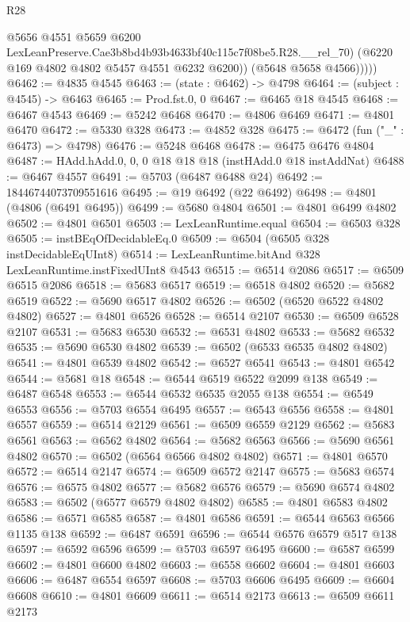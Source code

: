 \begin{lexlean}{R28}
\begin{coremodule}
                @5656
                @4551
                @5659
                @6200
                LexLeanPreserve.Cae3b8bd4b93b4633bf40c115c7f08be5.R28.__rel_70)
              (@6220 @169 @4802 @4802 @5457 @4551 @6232 @6200))
            (@5648 @5658 @4566)))))
@6462 := @4835 @4545
@6463 := (state : @6462) -> @4798
@6464 := (subject : @4545) -> @6463
@6465 := Prod.fst.{0, 0}
@6467 := @6465 @18 @4545
@6468 := @6467 @4543
@6469 := @5242 @6468
@6470 := @4806 @6469
@6471 := @4801 @6470
@6472 := @5330 @328
@6473 := @4852 @328
@6475 := @6472 (fun ("_" : @6473) => @4798)
@6476 := @5248 @6468
@6478 := @6475 @6476 @4804
@6487 := HAdd.hAdd.{0, 0, 0} @18 @18 @18 (instHAdd.{0} @18 instAddNat)
@6488 := @6467 @4557
@6491 := @5703 (@6487 @6488 @24)
@6492 := 18446744073709551616
@6495 := @19 @6492 (@22 @6492)
@6498 := @4801 (@4806 (@6491 @6495))
@6499 := @5680 @4804
@6501 := @4801 @6499 @4802
@6502 := @4801 @6501
@6503 := LexLeanRuntime.equal
@6504 := @6503 @328
@6505 := instBEqOfDecidableEq.{0}
@6509 := @6504 (@6505 @328 instDecidableEqUInt8)
@6514 := LexLeanRuntime.bitAnd @328 LexLeanRuntime.instFixedUInt8 @4543
@6515 := @6514 @2086
@6517 := @6509 @6515 @2086
@6518 := @5683 @6517
@6519 := @6518 @4802
@6520 := @5682 @6519
@6522 := @5690 @6517 @4802
@6526 := @6502 (@6520 @6522 @4802 @4802)
@6527 := @4801 @6526
@6528 := @6514 @2107
@6530 := @6509 @6528 @2107
@6531 := @5683 @6530
@6532 := @6531 @4802
@6533 := @5682 @6532
@6535 := @5690 @6530 @4802
@6539 := @6502 (@6533 @6535 @4802 @4802)
@6541 := @4801 @6539 @4802
@6542 := @6527 @6541
@6543 := @4801 @6542
@6544 := @5681 @18
@6548 := @6544 @6519 @6522 @2099 @138
@6549 := @6487 @6548
@6553 := @6544 @6532 @6535 @2055 @138
@6554 := @6549 @6553
@6556 := @5703 @6554 @6495
@6557 := @6543 @6556
@6558 := @4801 @6557
@6559 := @6514 @2129
@6561 := @6509 @6559 @2129
@6562 := @5683 @6561
@6563 := @6562 @4802
@6564 := @5682 @6563
@6566 := @5690 @6561 @4802
@6570 := @6502 (@6564 @6566 @4802 @4802)
@6571 := @4801 @6570
@6572 := @6514 @2147
@6574 := @6509 @6572 @2147
@6575 := @5683 @6574
@6576 := @6575 @4802
@6577 := @5682 @6576
@6579 := @5690 @6574 @4802
@6583 := @6502 (@6577 @6579 @4802 @4802)
@6585 := @4801 @6583 @4802
@6586 := @6571 @6585
@6587 := @4801 @6586
@6591 := @6544 @6563 @6566 @1135 @138
@6592 := @6487 @6591
@6596 := @6544 @6576 @6579 @517 @138
@6597 := @6592 @6596
@6599 := @5703 @6597 @6495
@6600 := @6587 @6599
@6602 := @4801 @6600 @4802
@6603 := @6558 @6602
@6604 := @4801 @6603
@6606 := @6487 @6554 @6597
@6608 := @5703 @6606 @6495
@6609 := @6604 @6608
@6610 := @4801 @6609
@6611 := @6514 @2173
@6613 := @6509 @6611 @2173

\end{coremodule}
\end{lexlean}
